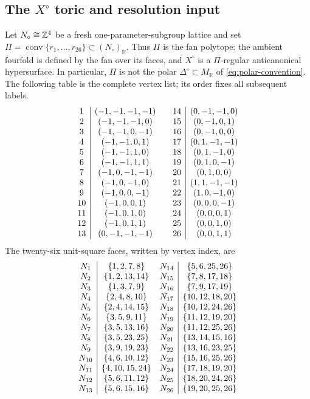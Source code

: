 \subsection[The X-circ toric and resolution input]{The $X^{\circ}$ toric and resolution input}
\label{app:xcirc-input}

Let $N_{\circ}\cong\mathbb Z^4$ be a fresh one-parameter-subgroup lattice and set
$\Pi=\operatorname{conv}\{r_1,\ldots,r_{26}\}\subset
(N_{\circ})_{\mathbb R}$. Thus $\Pi$ is the fan polytope: the ambient
fourfold is defined by the fan over its faces, and $X^{\circ}$ is a
$\Pi$-regular anticanonical hypersurface. In particular, $\Pi$ is not the
polar $\Delta^{\circ}\subset M_{\mathbb R}$ of
\eqref{eq:polar-convention}. The following table is the complete vertex list;
its order fixes all subsequent labels.
\begin{equation}
\begin{array}{c|c@{\qquad}c|c}
1&(-1,-1,-1,-1)&14&(0,-1,-1,0)\\
2&(-1,-1,-1,0)&15&(0,-1,0,1)\\
3&(-1,-1,0,-1)&16&(0,-1,0,0)\\
4&(-1,-1,0,1)&17&(0,1,-1,-1)\\
5&(-1,-1,1,0)&18&(0,1,-1,0)\\
6&(-1,-1,1,1)&19&(0,1,0,-1)\\
7&(-1,0,-1,-1)&20&(0,1,0,0)\\
8&(-1,0,-1,0)&21&(1,1,-1,-1)\\
9&(-1,0,0,-1)&22&(1,0,-1,0)\\
10&(-1,0,0,1)&23&(0,0,0,-1)\\
11&(-1,0,1,0)&24&(0,0,0,1)\\
12&(-1,0,1,1)&25&(0,0,1,0)\\
13&(0,-1,-1,-1)&26&(0,0,1,1)
\end{array}
 \label{eq:xcirc-vertices}
\end{equation}
The twenty-six unit-square faces, written by vertex index, are
\begin{equation}
\begin{array}{c|c@{\quad}c|c}
N_1&\{1,2,7,8\}&N_{14}&\{5,6,25,26\}\\
N_2&\{1,2,13,14\}&N_{15}&\{7,8,17,18\}\\
N_3&\{1,3,7,9\}&N_{16}&\{7,9,17,19\}\\
N_4&\{2,4,8,10\}&N_{17}&\{10,12,18,20\}\\
N_5&\{2,4,14,15\}&N_{18}&\{10,12,24,26\}\\
N_6&\{3,5,9,11\}&N_{19}&\{11,12,19,20\}\\
N_7&\{3,5,13,16\}&N_{20}&\{11,12,25,26\}\\
N_8&\{3,5,23,25\}&N_{21}&\{13,14,15,16\}\\
N_9&\{3,9,19,23\}&N_{22}&\{13,16,23,25\}\\
N_{10}&\{4,6,10,12\}&N_{23}&\{15,16,25,26\}\\
N_{11}&\{4,10,15,24\}&N_{24}&\{17,18,19,20\}\\
N_{12}&\{5,6,11,12\}&N_{25}&\{18,20,24,26\}\\
N_{13}&\{5,6,15,16\}&N_{26}&\{19,20,25,26\}
\end{array}
 \label{eq:xcirc-node-faces}
\end{equation}
